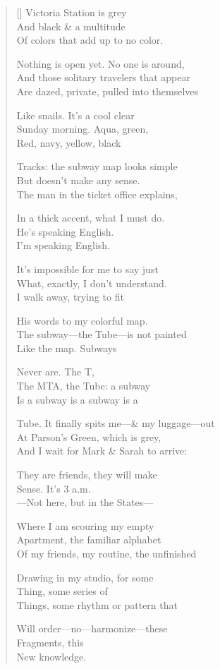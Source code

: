 \label{ch:subway_maps}
\settowidth{\versewidth}{Tube. It finally spits me—\& my luggage—out}
\begin{verse}[\versewidth]
Victoria Station is grey\\
And black \& a multitude\\
Of colors that add up to no color.

Nothing is open yet.   No one is around,\\
And those solitary travelers that appear\\
Are dazed, private, pulled into themselves

Like snails.   It's a cool clear\\
Sunday morning.  Aqua, green,\\
Red, navy, yellow, black

Tracks: the subway map looks simple\\
But doesn't make any sense.\\
The man in the ticket office explains,

In a thick accent, what I must do.\\
He's speaking English.\\
I'm speaking English.

It's impossible for me to say just\\
What, exactly, I don't understand.\\
I walk away, trying to fit

His words to my colorful map.\\
The subway---the Tube---is not painted\\
Like the map.     Subways

Never are. The T,\\
The MTA, the Tube: a subway\\
Is a subway is a subway is a

Tube. It finally spits me---\& my luggage---out\\
At Parson's Green, which is grey,\\
And I wait for Mark \& Sarah to arrive:

They are friends, they will make\\
Sense. It's 3 a.m.\\
---Not here, but in the States---

Where I am scouring my empty\\
Apartment, the familiar alphabet\\
Of my friends, my routine, the unfinished

Drawing in my studio, for some\\
Thing, some series of\\
Things, some rhythm or pattern that

Will order---no---harmonize---these\\
Fragments, this\\
New knowledge.
\end{verse}
